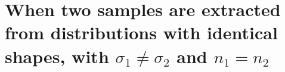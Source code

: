 \documentclass[
  man,floatsintext]{apa6}
\begin{document}
\hypertarget{when-two-samples-are-extracted-from-distributions-with-identical-shapes-with-sigma_1-neq-sigma_2-and-n_1n_2}{%
\section{\texorpdfstring{When two samples are extracted from distributions with identical shapes, with \textbf{\(\sigma_1 \neq \sigma_2\)} and \textbf{\(n_1=n_2\)}}{When two samples are extracted from distributions with identical shapes, with \textbackslash sigma\_1 \textbackslash neq \textbackslash sigma\_2 and n\_1=n\_2}}\label{when-two-samples-are-extracted-from-distributions-with-identical-shapes-with-sigma_1-neq-sigma_2-and-n_1n_2}}
\end{document}

